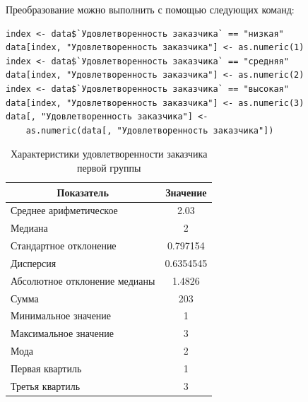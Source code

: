 Преобразование можно выполнить с помощью следующих команд:
\begin{verbatim}
index <- data$`Удовлетворенность заказчика` == "низкая"
data[index, "Удовлетворенность заказчика"] <- as.numeric(1)
index <- data$`Удовлетворенность заказчика` == "средняя"
data[index, "Удовлетворенность заказчика"] <- as.numeric(2)
index <- data$`Удовлетворенность заказчика` == "высокая"
data[index, "Удовлетворенность заказчика"] <- as.numeric(3)
data[, "Удовлетворенность заказчика"] <- 
    as.numeric(data[, "Удовлетворенность заказчика"])
\end{verbatim}

\begin{table}[H]
	\centering
	\caption{Характеристики удовлетворенности заказчика первой группы}
	\begin{tabular}{|l|c|}
		\hline
		\multicolumn{1}{|c|}{\textbf{Показатель}} & \textbf{Значение}\\ \hline
		Среднее арифметическое        & 2.03      \\ \hline
		Медиана                       & 2         \\ \hline
		Стандартное отклонение        & 0.797154  \\ \hline
		Дисперсия                      & 0.6354545 \\ \hline
		Абсолютное отклонение медианы & 1.4826    \\ \hline
		Сумма                         & 203       \\ \hline
		Минимальное значение          & 1         \\ \hline
		Максимальное значение         & 3         \\ \hline
		Мода & 2 \\ \hline
		Первая квартиль & 1 \\ \hline
		Третья квартиль & 3 \\ \hline
	\end{tabular}
\end{table}

